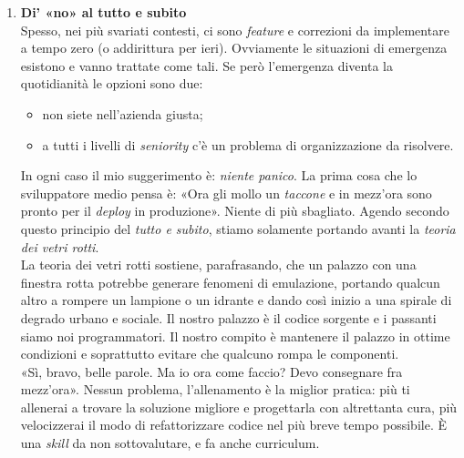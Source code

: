 \begin{enumerate}
\item \textbf{Di' «no» al tutto e subito} \\
Spesso, nei più svariati contesti, ci sono \emph{feature} e correzioni da implementare a tempo zero (o addirittura per ieri). Ovviamente le situazioni di emergenza esistono e vanno trattate come tali. Se però l’emergenza diventa la quotidianità le opzioni sono due:
	\begin{itemize}
		\item non siete nell'azienda giusta;
		\item a tutti i livelli di \emph{seniority} c'è un problema di organizzazione da risolvere.
	\end{itemize}
In ogni caso il mio suggerimento è: \emph{niente panico}. La prima cosa che lo sviluppatore medio pensa è: «Ora gli mollo un \emph{taccone} e in mezz’ora sono pronto per il \emph{deploy} in produzione». Niente di più sbagliato. Agendo secondo questo principio del \emph{tutto e subito}, stiamo solamente portando avanti la \emph{teoria dei vetri rotti}. \\
La teoria dei vetri rotti sostiene, parafrasando, che un palazzo con una finestra rotta potrebbe generare fenomeni di emulazione, portando qualcun altro a rompere un lampione o un idrante e dando così inizio a una spirale di degrado urbano e sociale. Il nostro palazzo è il codice sorgente e i passanti siamo noi programmatori. Il nostro compito è mantenere il palazzo in ottime condizioni e soprattutto evitare che qualcuno rompa le componenti. \\
«Sì, bravo, belle parole. Ma io ora come faccio? Devo consegnare fra mezz’ora». Nessun problema, l’allenamento è la miglior pratica: più ti allenerai a trovare la soluzione migliore e progettarla con altrettanta cura, più velocizzerai il modo di refattorizzare codice nel più breve tempo possibile. È una \emph{skill} da non sottovalutare, e fa anche curriculum.


\end{enumerate}
